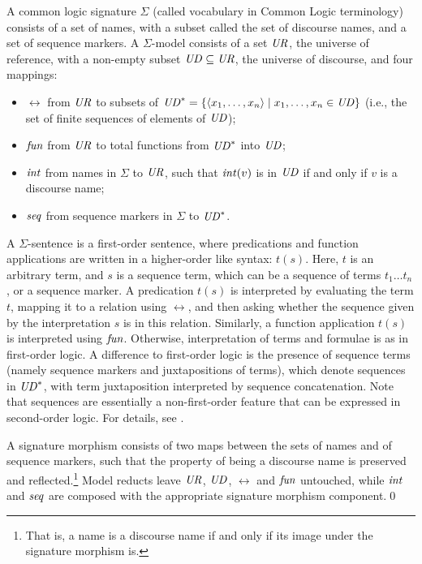 \documentclass[10pt, a4paper]{isov2}
\begin{document}
\begin{definition}\label{sem:CommonLogic}
A common logic signature
$\Sigma$ (called vocabulary in Common Logic terminology) consists of a
set of names, with a subset called the set of discourse names, and a
set of sequence markers.
A $\Sigma$-model consists of a set $\mathit{UR}$,
the universe of reference, with a non-empty subset $\mathit{UD}\subseteq \mathit{UR}$,
the universe of discourse, and four mappings:
  \begin{itemize}
   \item $\rel$ from $\mathit{UR}$ to subsets of $\mathit{UD}^* = \{\langle x_1,\ldots,x_n \rangle \mid x_1,\ldots,x_n \in \mathit{UD}\}$ (i.e., the set of finite sequences of
elements of $\mathit{UD}$);
   \item $\mathit{fun}$ from $\mathit{UR}$ to total functions from $\mathit{UD}^*$ into $\mathit{UD}$;
   \item $\mathit{int}$ from names in $\Sigma$ to $\mathit{UR}$, such that
$\mathit{int}(v)$ is in $\mathit{UD}$ if and only if $v$ is a discourse name;
   \item $\mathit{seq}$ from sequence markers in $\Sigma$ to $\mathit{UD}^*$.
  \end{itemize}  A $\Sigma$-sentence is a first-order
sentence, where predications and function applications are written
in a higher-order like syntax: $t(s)$.
Here, $t$ is an arbitrary term, and $s$ is a sequence term, which can
be a sequence of terms $t_1\ldots t_n$, or a sequence marker.
A predication $t(s)$ is interpreted by evaluating the term $t$,
mapping it to a relation using $\rel$, and then asking whether the sequence
given by the interpretation $s$ is in this relation.  
Similarly, a function application $t(s)$ is interpreted using $\mathit{fun}$.
Otherwise, interpretation of terms and formulae is as in
first-order logic. 
A 
difference to first-order logic is the presence of sequence terms (namely sequence markers and
juxtapositions of terms), which denote sequences in $\mathit{UD}^*$, with term
juxtaposition interpreted by sequence concatenation.
Note that sequences are essentially a non-first-order feature that
can be expressed in second-order logic.
For details, see \cite{CommonLogic:oldfashioned}.

A \Clogic signature morphism 
consists of two maps between the sets of names and of sequence markers, such that the property of 
being a discourse name is preserved and reflected.\footnote{That  is, a name is a discourse
name if and only if its image under the signature morphism is.}
  Model reducts leave $\mathit{UR}$, $\mathit{UD}$, 
$\rel$ and $\mathit{fun}$ untouched, while $\mathit{int}$ and $\mathit{seq}$ are composed with the appropriate
signature morphism component.\quad\qed
\end{definition}
%
\end{document}
